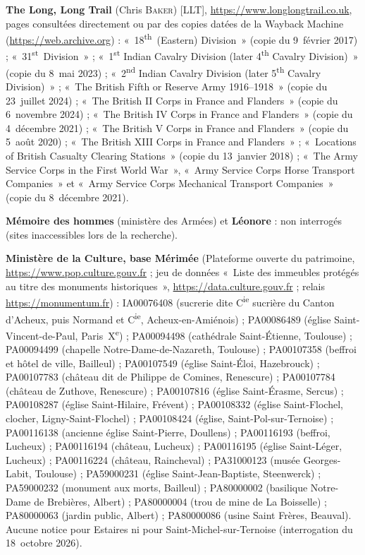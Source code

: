 \begin{biblist}
\item \textbf{The Long, Long Trail} (Chris \textsc{Baker}) [LLT], \url{https://www.longlongtrail.co.uk}, pages consultées directement ou par des copies datées de la Wayback Machine (\url{https://web.archive.org}) : «~18\textsuperscript{th}~(Eastern) Division~» (copie du 9~février 2017) ; «~31\textsuperscript{st}~Division~» ; «~1\textsuperscript{st} Indian Cavalry Division (later 4\textsuperscript{th} Cavalry Division)~» (copie du 8~mai 2023) ; «~2\textsuperscript{nd} Indian Cavalry Division (later 5\textsuperscript{th} Cavalry Division)~» ; «~The British Fifth or Reserve Army 1916--1918~» (copie du 23~juillet 2024) ; «~The British II Corps in France and Flanders~» (copie du 6~novembre 2024) ; «~The British IV Corps in France and Flanders~» (copie du 4~décembre 2021) ; «~The British V Corps in France and Flanders~» (copie du 5~août 2020) ; «~The British XIII Corps in France and Flanders~» ; «~Locations of British Casualty Clearing Stations~» (copie du 13~janvier 2018) ; «~The Army Service Corps in the First World War~», «~Army Service Corps Horse Transport Companies~» et «~Army Service Corps Mechanical Transport Companies~» (copie du 8~décembre 2021).
\item \textbf{Mémoire des hommes} (ministère des Armées) et \textbf{Léonore} : non interrogés (sites inaccessibles lors de la recherche).
\item \textbf{Ministère de la Culture, base Mérimée} (Plateforme ouverte du patrimoine, \url{https://www.pop.culture.gouv.fr} ; jeu de données «~Liste des immeubles protégés au titre des monuments historiques~», \url{https://data.culture.gouv.fr} ; relais \url{https://monumentum.fr}) : IA00076408 (sucrerie dite C\textsuperscript{ie} sucrière du Canton d'Acheux, puis Normand et C\textsuperscript{ie}, Acheux-en-Amiénois) ; PA00086489 (église Saint-Vincent-de-Paul, Paris~X\textsuperscript{e}) ; PA00094498 (cathédrale Saint-Étienne, Toulouse) ; PA00094499 (chapelle Notre-Dame-de-Nazareth, Toulouse) ; PA00107358 (beffroi et hôtel de ville, Bailleul) ; PA00107549 (église Saint-Éloi, Hazebrouck) ; PA00107783 (château dit de Philippe de Comines, Renescure) ; PA00107784 (château de Zuthove, Renescure) ; PA00107816 (église Saint-Érasme, Sercus) ; PA00108287 (église Saint-Hilaire, Frévent) ; PA00108332 (église Saint-Flochel, clocher, Ligny-Saint-Flochel) ; PA00108424 (église, Saint-Pol-sur-Ternoise) ; PA00116138 (ancienne église Saint-Pierre, Doullens) ; PA00116193 (beffroi, Lucheux) ; PA00116194 (château, Lucheux) ; PA00116195 (église Saint-Léger, Lucheux) ; PA00116224 (château, Raincheval) ; PA31000123 (musée Georges-Labit, Toulouse) ; PA59000231 (église Saint-Jean-Baptiste, Steenwerck) ; PA59000232 (monument aux morts, Bailleul) ; PA80000002 (basilique Notre-Dame de Brebières, Albert) ; PA80000004 (trou de mine de La Boisselle) ; PA80000063 (jardin public, Albert) ; PA80000086 (usine Saint Frères, Beauval). Aucune notice pour Estaires ni pour Saint-Michel-sur-Ternoise (interrogation du 18~octobre 2026).

\end{biblist}
